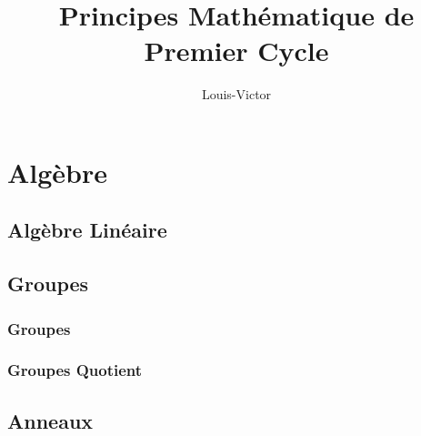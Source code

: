 \documentclass{book}
\title{Principes Mathématique de Premier Cycle}
\author{Louis-Victor}
\theoremstyle{plain}
\theoremstyle{definition}
\begin{document}
\maketitle
\date{}
\tableofcontents
\newpage
\part{Algèbre}
\label{part:alg}
\chapter{Algèbre Linéaire}


\chapter{Groupes}
\label{ch:alg:group}

\section{Groupes}
\label{sec:alg:group:group}
\section{Groupes Quotient}
\label{sec:alg:group:quotients}


\chapter{Anneaux}
\label{ch:alg:ring}

\end{document}
